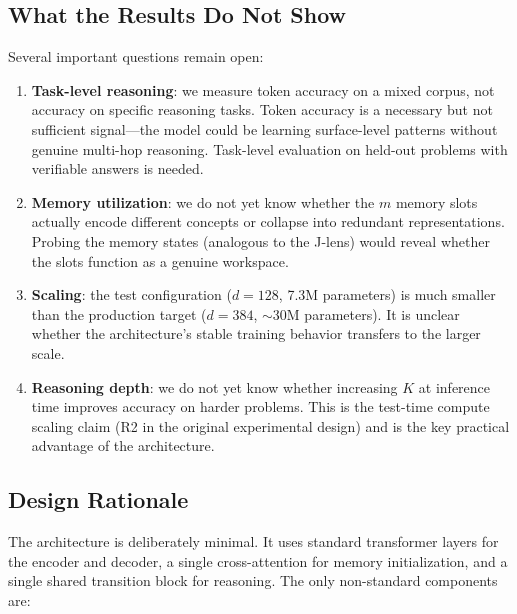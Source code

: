 \documentclass[11pt,a4paper]{article}
\begin{document}
\subsection{What the Results Do Not Show}

Several important questions remain open:

\begin{enumerate}[nosep]
    \item \textbf{Task-level reasoning}: we measure token accuracy on a mixed corpus, not accuracy on specific reasoning tasks. Token accuracy is a necessary but not sufficient signal---the model could be learning surface-level patterns without genuine multi-hop reasoning. Task-level evaluation on held-out problems with verifiable answers is needed.
    \item \textbf{Memory utilization}: we do not yet know whether the $m$ memory slots actually encode different concepts or collapse into redundant representations. Probing the memory states (analogous to the J-lens) would reveal whether the slots function as a genuine workspace.
    \item \textbf{Scaling}: the test configuration ($d{=}128$, 7.3M parameters) is much smaller than the production target ($d{=}384$, $\sim$30M parameters). It is unclear whether the architecture's stable training behavior transfers to the larger scale.
    \item \textbf{Reasoning depth}: we do not yet know whether increasing $K$ at inference time improves accuracy on harder problems. This is the test-time compute scaling claim (R2 in the original experimental design) and is the key practical advantage of the architecture.
\end{enumerate}

\subsection{Design Rationale}

The architecture is deliberately minimal. It uses standard transformer layers for the encoder and decoder, a single cross-attention for memory initialization, and a single shared transition block for reasoning. The only non-standard components are:
\end{document}
